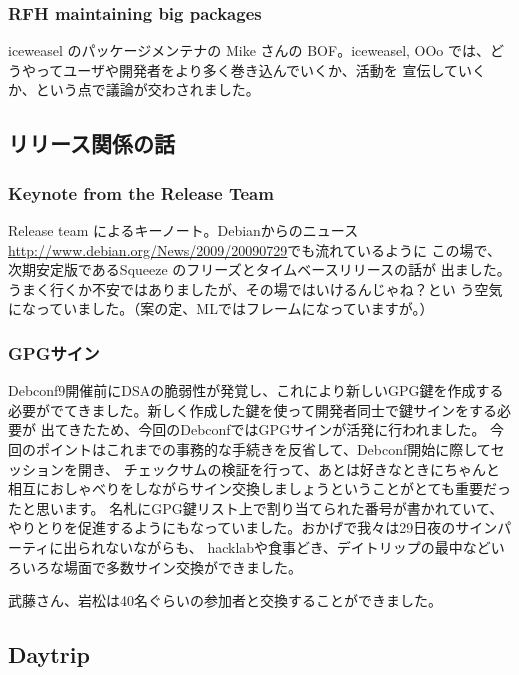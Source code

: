 \documentclass[mingoth,a4paper]{jsarticle}
\begin{document}
\subsubsection{RFH maintaining big packages}
       iceweasel のパッケージメンテナの Mike さんの BOF。iceweasel, OOo
       では、どうやってユーザや開発者をより多く巻き込んでいくか、活動を
       宣伝していくか、という点で議論が交わされました。

\subsection{リリース関係の話}
\subsubsection{Keynote from the Release Team}
Release team によるキーノート。Debianからのニュース
\url{http://www.debian.org/News/2009/20090729}でも流れているように
この場で、次期安定版であるSqueeze のフリーズとタイムベースリリースの話が
出ました。うまく行くか不安ではありましたが、その場ではいけるんじゃね？とい
う空気になっていました。（案の定、MLではフレームになっていますが。）

\subsubsection{GPGサイン}
Debconf9開催前にDSAの脆弱性が発覚し、これにより新しいGPG鍵を作成する
必要がでてきました。新しく作成した鍵を使って開発者同士で鍵サインをする必要が
出てきたため、今回のDebconfではGPGサインが活発に行われました。
今回のポイントはこれまでの事務的な手続きを反省して、Debconf開始に際してセッションを開き、
チェックサムの検証を行って、あとは好きなときにちゃんと相互におしゃべりをしながらサイン交換しましょうということがとても重要だったと思います。
名札にGPG鍵リスト上で割り当てられた番号が書かれていて、やりとりを促進するようにもなっていました。おかげで我々は29日夜のサインパーティに出られないながらも、
hacklabや食事どき、デイトリップの最中などいろいろな場面で多数サイン交換ができました。

武藤さん、岩松は40名ぐらいの参加者と交換することができました。

\subsection{Daytrip}
\end{document}
